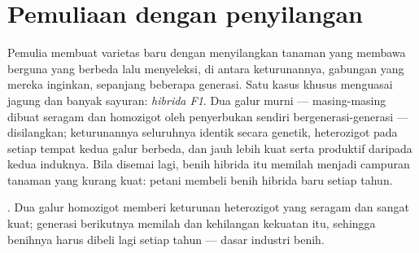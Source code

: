 \section{Pemuliaan dengan penyilangan}

\begin{proposition}\label{prop:g12:domesticated-plants:hybrids}
Pemulia membuat varietas baru dengan menyilangkan tanaman yang membawa
 berguna yang berbeda lalu menyeleksi, di antara keturunannya,
gabungan yang mereka inginkan, sepanjang beberapa generasi. Satu kasus
khusus menguasai jagung dan banyak sayuran: \emph{hibrida
F1}. Dua galur murni --- masing-masing dibuat seragam
dan homozigot oleh penyerbukan sendiri bergenerasi-generasi ---
disilangkan; keturunannya seluruhnya identik secara genetik,
heterozigot pada setiap  tempat kedua galur berbeda, dan jauh lebih
kuat serta produktif daripada kedua induknya. Bila disemai lagi, benih
hibrida itu memilah menjadi campuran tanaman yang kurang kuat: petani
membeli benih hibrida baru setiap tahun.
\end{proposition}
\admitted

\begin{omfigure}

{\small {}. Dua galur homozigot memberi keturunan heterozigot
yang seragam dan sangat kuat; generasi berikutnya memilah dan
kehilangan kekuatan itu, sehingga benihnya harus dibeli lagi setiap
tahun --- dasar industri benih.}
\end{omfigure}

